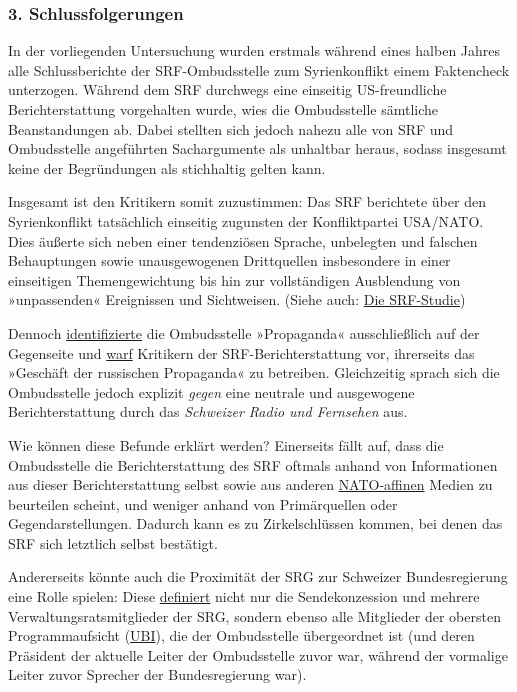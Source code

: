 \hypertarget{3-schlussfolgerungen}{%
\subsubsection{3. Schlussfolgerungen}\label{3-schlussfolgerungen}}

In der vorliegenden Untersuchung wurden erstmals während eines halben
Jahres alle Schlussberichte der SRF-Ombudsstelle zum Syrienkonflikt
einem Faktencheck unterzogen. Während dem SRF durchwegs eine einseitig
US-freundliche Berichterstattung vorgehalten wurde, wies die
Ombudsstelle sämtliche Beanstandungen ab. Dabei stellten sich jedoch
nahezu alle von SRF und Ombudsstelle angeführten Sachargumente als
unhaltbar heraus, sodass insgesamt keine der Begründungen als
stichhaltig gelten kann.

Insgesamt ist den Kritikern somit zuzustimmen: Das SRF berichtete über
den Syrienkonflikt tatsächlich einseitig zugunsten der Konfliktpartei
USA/NATO. Dies äußerte sich neben einer tendenziösen Sprache, unbelegten
und falschen Behauptungen sowie unausgewogenen Drittquellen insbesondere
in einer einseitigen Themengewichtung bis hin zur vollständigen
Ausblendung von »unpassenden« Ereignissen und Sichtweisen. (Siehe auch:
\href{https://swprs.org/srf-propaganda-analyse/}{Die SRF-Studie})

Dennoch
\href{https://www.srgd.ch/de/aktuelles/news/2017/02/13/syrien-berichterstattung-von-radio-und-fernsehen-srf-beanstandet/}{identifizierte}
die Ombudsstelle »Propaganda« ausschließlich auf der Gegenseite und
\href{https://www.srgd.ch/de/aktuelles/news/2016/11/19/rundschau-sondersendung-zum-assad-interview-beanstandet/}{warf}
Kritikern der SRF-Berichterstattung vor, ihrerseits das »Geschäft der
russischen Propaganda« zu betreiben. Gleichzeitig sprach sich die
Ombudsstelle jedoch explizit \emph{gegen} eine neutrale und ausgewogene
Berichterstattung durch das \emph{Schweizer Radio und Fernsehen} aus.

Wie können diese Befunde erklärt werden? Einerseits fällt auf, dass die
Ombudsstelle die Berichterstattung des SRF oftmals anhand von
Informationen aus dieser Berichterstattung selbst sowie aus anderen
\href{https://swprs.org/medien-navigator/}{NATO-affinen} Medien zu
beurteilen scheint, und weniger anhand von Primärquellen oder
Gegendarstellungen. Dadurch kann es zu Zirkelschlüssen kommen, bei denen
das SRF sich letztlich selbst bestätigt.

Andererseits könnte auch die Proximität der SRG zur Schweizer
Bundesregierung eine Rolle spielen: Diese
\href{https://swprs.org/2017/03/01/srg-idee-suisse/}{definiert} nicht
nur die Sendekonzession und mehrere Verwaltungsratsmitglieder der SRG,
sondern ebenso alle Mitglieder der obersten Programmaufsicht
(\href{https://www.ubi.admin.ch/}{UBI}), die der Ombudsstelle
übergeordnet ist (und deren Präsident der aktuelle Leiter der
Ombudsstelle zuvor war, während der vormalige Leiter zuvor Sprecher der
Bundesregierung war).

